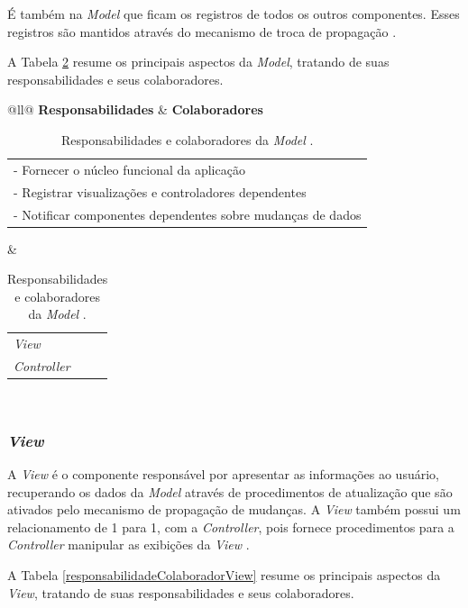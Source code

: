 É também na \textit{Model} que ficam os registros de todos os outros componentes. Esses registros são mantidos através do mecanismo de troca de propagação \cite{buschmann1996system}. 

A Tabela \ref{responsabilidadeColaboradorModel} resume os principais aspectos da \textit{Model}, tratando de suas responsabilidades e seus colaboradores. 

\begin{table}[h!]
	\centering
	\caption{Responsabilidades e colaboradores da \textit{Model} \cite{buschmann1996system}.}
	\label{responsabilidadeColaboradorModel}
	\begin{tabular}{@{}ll@{}}
		\hline
		\textbf{Responsabilidades} &   \textbf{Colaboradores} \\ \hline
		\begin{tabular}[c]{@{}l@{}}- Fornecer o núcleo funcional da aplicação\\ - Registrar visualizações e controladores dependentes\\ - Notificar componentes dependentes sobre mudanças de dados\end{tabular} & \begin{tabular}[c]{@{}l@{}}\textit{View}\\ \textit{Controller}\end{tabular} \\ \hline
	\end{tabular}
\end{table}

\subsubsection{\textit{View}}

A \textit{View} é o componente responsável por apresentar as informações ao usuário, recuperando os dados da \textit{Model} através de procedimentos de atualização que são ativados pelo mecanismo de propagação de mudanças. A \textit{View} também possui um relacionamento de 1 para 1, com a \textit{Controller}, pois fornece procedimentos para a \textit{Controller} manipular as exibições da \textit{View} \cite{buschmann1996system}.

A Tabela \ref{responsabilidadeColaboradorView} resume os principais aspectos da \textit{View}, tratando de suas responsabilidades e seus colaboradores. 

